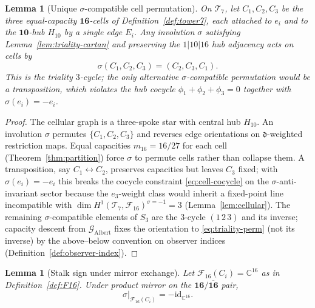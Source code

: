 \documentclass[11pt]{article}
\theoremstyle{plain}
\newtheorem{lemma}[theorem]{Lemma}
\theoremstyle{definition}
\theoremstyle{remark}
\numberwithin{equation}{section}
\newcommand{\C}{\mathbb{C}}
\begin{document}
\begin{lemma}[Unique $\sigma$-compatible cell permutation]\label{lem:triality-perm}
On $\mathcal{T}_7$, let $C_1,C_2,C_3$ be the three equal-capacity
$\mathbf{16}$-cells of Definition~\ref{def:tower7}, each attached to $e_i$ and
to the $\mathbf{10}$-hub $H_{10}$ by a single edge $E_i$. Any involution
$\sigma$ satisfying Lemma~\ref{lem:triality-cartan} and preserving the
$1|10|16$ hub adjacency acts on cells by
\begin{equation}\label{eq:triality-perm}
  \sigma(C_1,C_2,C_3)=(C_2,C_3,C_1).
\end{equation}
This is the triality $3$-cycle; the only alternative $\sigma$-compatible
permutation would be a transposition, which violates the hub cocycle
$\phi_1+\phi_2+\phi_3=0$ together with $\sigma(e_i)=-e_i$.
\end{lemma}

\begin{proof}
The cellular graph is a three-spoke star with central hub $H_{10}$. An
involution $\sigma$ permutes $\{C_1,C_2,C_3\}$ and reverses edge orientations
on $\mathfrak{d}$-weighted restriction maps. Equal capacities
$m_{16}=16/27$ for each cell (Theorem~\ref{thm:partition}) force $\sigma$ to
permute cells rather than collapse them. A transposition, say
$C_1\leftrightarrow C_2$, preserves capacities but leaves $C_3$ fixed; with
$\sigma(e_i)=-e_i$ this breaks the cocycle constraint
\eqref{eq:cell-cocycle} on the $\sigma$-anti-invariant sector because the
$e_3$-weight class would inherit a fixed-point line incompatible with
$\dim H^1(\mathcal{T}_7,\mathcal{F}_{16})^{\sigma=-1}=3$
(Lemma~\ref{lem:cellular}). The remaining $\sigma$-compatible elements of
$S_3$ are the $3$-cycle $(1\,2\,3)$ and its inverse; capacity descent from
$\mathcal{G}_{\mathrm{Albert}}$ fixes the orientation to
\eqref{eq:triality-perm} (not its inverse) by the above--below convention on
observer indices (Definition~\ref{def:observer-index}).
\end{proof}

\begin{lemma}[Stalk sign under mirror exchange]\label{lem:triality-sign}
Let $\mathcal{F}_{16}(C_i)=\C^{16}$ as in Definition~\ref{def:F16}. Under
product mirror on the $\mathbf{16}/\overline{\mathbf{16}}$ pair,
\begin{equation}\label{eq:triality-sign}
  \sigma|_{\mathcal{F}_{16}(C_i)}=-\mathrm{id}_{\C^{16}}.
\end{equation}
\end{lemma}
\end{document}
